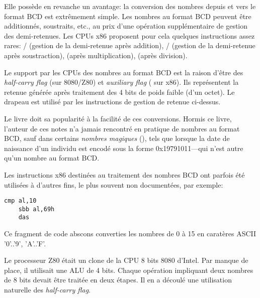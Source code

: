 Elle possède en revanche un avantage: la conversion des nombres depuis et vers le format \ac{BCD} est extrêmement simple.
Les nombres au format BCD peuvent être additionnés, soustraits, etc., au prix d'une opération supplémentaire de gestion des demi-retenues.
Les CPUs x86 proposent pour cela quelques instructions assez rares:
/ (gestion de la demi-retenue après addition),
/ (gestion de la demi-retenue après soustraction),
 (après multiplication),
 (après division).

Le support par les CPUs des nombres au format \ac{BCD} est la raison d'être des \emph{half-carry flag} (sur 8080/Z80) et
\emph{auxiliary flag} ( sur x86).
Ils représentent la retenue générée après traitement des 4 bits de poids faible (d'un octet).
Le drapeau est utilisé par les instructions de gestion de retenue ci-dessus.

Le livre  doit sa popularité à la facilité de ces conversions.
Hormis ce livre, l'auteur de ces notes n'a jamais rencontré en pratique de nombres au format \ac{BCD}, sauf dans certains
\emph{nombres magiques} (),
tels que lorsque la date de naissance d'un individu est encodé sous la forme 0x19791011---qui n'est autre qu'un nombre au format \ac{BCD}.


Les instructions x86 destinées au traitement des nombres \ac{BCD} ont parfois été utilisées à d'autres fins, le plus souvent non documentées, par exemple:

\begin{lstlisting}[style=customasmx86]
	cmp al,10
	sbb al,69h
	das
\end{lstlisting}

Ce fragment de code abscons converties les nombres de 0 à 15 en caratères \ac{ASCII} '0'..'9', 'A'..'F'.


Le processeur Z80 était un clone de la CPU 8 bits 8080 d'Intel. Par manque de place, il utilisait une \ac{ALU} de 4 bits.
Chaque opération impliquant deux nombres de 8 bits devait être traitée en deux étapes.
Il en a découlé une utilisation naturelle des \emph{half-carry flag}.

